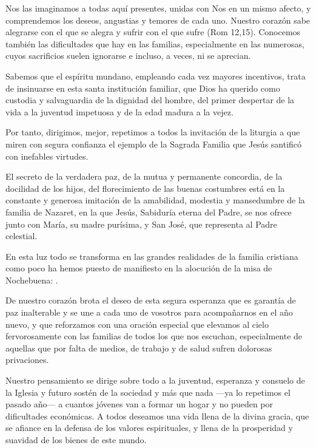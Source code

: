 Nos las imaginamos a todas aquí presentes, unidas con Nos en un mismo afecto, y comprendemos los deseos, angustias y temores de cada uno. Nuestro corazón sabe alegrarse con el que se alegra y sufrir con el que sufre (Rom 12,15). Conocemos también las dificultades que hay en las familias, especialmente en las numerosas, cuyos sacrificios suelen ignorarse e incluso, a veces, ni se aprecian.

Sabemos que el espíritu mundano, empleando cada vez mayores incentivos, trata de insinuarse en esta santa institución familiar, que Dios ha querido como custodia y salvaguardia de la dignidad del hombre, del primer despertar de la vida a la juventud impetuosa y de la edad madura a la vejez.

Por tanto, dirigimos, mejor, repetimos a todos la invitación de la liturgia a que miren con segura confianza el ejemplo de la Sagrada Familia que Jesús santificó con inefables virtudes.

El secreto de la verdadera paz, de la mutua y permanente concordia, de la docilidad de los hijos, del florecimiento de las buenas costumbres está en la constante y generosa imitación de la amabilidad, modestia y mansedumbre de la familia de Nazaret, en la que Jesús, Sabiduría eterna del Padre, se nos ofrece junto con María, su madre purísima, y San José, que representa al Padre celestial.

En esta luz todo se transforma en las grandes realidades de la familia cristiana como poco ha hemos puesto de manifiesto en la alocución de la misa de Nochebuena: .

De nuestro corazón brota el deseo de esta segura esperanza que es garantía de paz inalterable y se une a cada uno de vosotros para acompañarnos en el año nuevo, y que reforzamos con una oración especial que elevamos al cielo fervorosamente con las familias de todos los que nos escuchan, especialmente de aquellas que por falta de medios, de trabajo y de salud sufren dolorosas privaciones.

Nuestro pensamiento se dirige sobre todo a la juventud, esperanza y consuelo de la Iglesia y futuro sostén de la sociedad y más que nada ---ya lo repetimos el pasado año--- a cuantos jóvenes van a formar un hogar y no pueden por dificultades económicas. A todos deseamos una vida llena de la divina gracia, que se afiance en la defensa de los valores espirituales, y llena de la prosperidad y suavidad de los bienes de este mundo.

